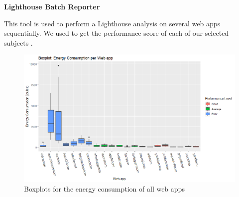 \textbf{Lighthouse Batch Reporter}

This tool is used to perform a Lighthouse analysis on several web apps sequentially. We used to get the performance score of each of our selected subjects \cite{WEBSITE:12}.

\begin{figure}
  \includegraphics[width=\textwidth]{./NewImages/Fig_3_Boxplot_for_All_Websites.png}
  \caption{Boxplots for the energy consumption of all web apps}
  \label{fig:boxplots-all}
\end{figure}